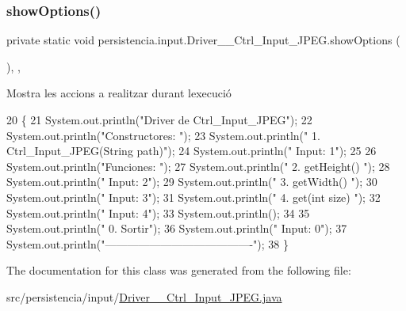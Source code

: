 \mbox{\label{classpersistencia_1_1input_1_1Driver____Ctrl__Input__JPEG_a3ffde336b648d23ae0a517210d0f8f38}} 
\subsubsection{\texorpdfstring{show\+Options()}{showOptions()}}
{\footnotesize\ttfamily private static void persistencia.\+input.\+Driver\+\_\+\+\_\+\+Ctrl\+\_\+\+Input\+\_\+\+J\+P\+E\+G.\+show\+Options (\begin{DoxyParamCaption}{ }\end{DoxyParamCaption})\hspace{0.3cm}{\ttfamily [inline]}, {\ttfamily [static]}, {\ttfamily [private]}}



Mostra les accions a realitzar durant l\textquotesingle{}execució 


\begin{DoxyCode}
20                                      \{
21         System.out.println(\textcolor{stringliteral}{"Driver de Ctrl\_Input\_JPEG"});
22         System.out.println(\textcolor{stringliteral}{"Constructores: "});
23         System.out.println(\textcolor{stringliteral}{"     1. Ctrl\_Input\_JPEG(String path)"});
24         System.out.println(\textcolor{stringliteral}{"     Input: 1"});
25 
26         System.out.println(\textcolor{stringliteral}{"Funciones: "});
27         System.out.println(\textcolor{stringliteral}{"     2. getHeight() "});
28         System.out.println(\textcolor{stringliteral}{"     Input: 2"});
29         System.out.println(\textcolor{stringliteral}{"     3. getWidth() "});
30         System.out.println(\textcolor{stringliteral}{"     Input: 3"});
31         System.out.println(\textcolor{stringliteral}{"     4. get(int size) "});
32         System.out.println(\textcolor{stringliteral}{"     Input: 4"});
33         System.out.println();
34 
35         System.out.println(\textcolor{stringliteral}{"     0. Sortir"});
36         System.out.println(\textcolor{stringliteral}{"     Input: 0"});
37         System.out.println(\textcolor{stringliteral}{"----------------------------------------"});
38     \}
\end{DoxyCode}


The documentation for this class was generated from the following file\+:\begin{DoxyCompactItemize}
\item 
src/persistencia/input/\hyperlink{Driver____Ctrl__Input__JPEG_8java}{Driver\+\_\+\+\_\+\+Ctrl\+\_\+\+Input\+\_\+\+J\+P\+E\+G.\+java}\end{DoxyCompactItemize}

